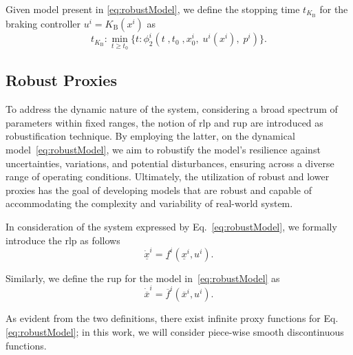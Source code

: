 %
\begin{definition} \label{def:stoppingTime}
	Given model present in \eqref{eq:robustModel}, we define the stopping time $t_{K_\mathrm{B}}$ for the braking controller  $u^i= K_\mathrm{B}(x^i)$ as
	\begin{equation*}
		t_{K_\mathrm{B}}: \underset{t \geq t_0}{\min}\{ t: \phi_2^i(t \;,t_0 \;,x_0^i, \;u^i(x^i), \;p^i)\}.
	\end{equation*}
\end{definition}
%
\subsection{Robust Proxies}
\label{subsec:robustProxies}
%
To address the dynamic nature of the system, considering a broad spectrum of parameters within fixed ranges, the notion of \gls{rlp} and \gls{rup} are introduced as robustification technique. By employing the latter, on the dynamical model~\eqref{eq:robustModel}, we aim to robustify the model's resilience against uncertainties, variations, and potential disturbances, ensuring across a diverse range of operating conditions. Ultimately, the utilization of robust and lower proxies has the goal of developing models that are robust and capable of accommodating the complexity and variability of real-world system.
%
\begin{definition}
	In consideration of the system expressed by Eq.~\eqref{eq:robustModel}, we formally introduce the \gls{rlp} as follows
	\begin{equation} \label{eq:rlp}
		\underline{\dot{x}}^i = \underline{f}^i(\underline{x}^i,u^i).
	\end{equation}
\end{definition}

\begin{definition}
	Similarly, we define the \gls{rup} for the model in~\eqref{eq:robustModel} as 
	\begin{equation} \label{eq:rup}
		\dot{\overline{x}}^i = \overline{f}^i(\overline{x}^i,u^i).
	\end{equation}
\end{definition}

As evident from the two definitions, there exist infinite proxy functions for Eq. \eqref{eq:robustModel}; in this work, we will consider piece-wise smooth discontinuous functions.

